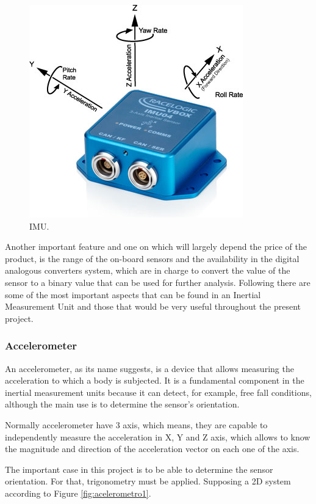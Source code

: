\begin{figure}[H]
	\center
	\includegraphics[scale=0.25]{imagenes/Balancing_robot/IMU3}
	\caption{IMU.}
	\label{fig:IMU3}
\end{figure}

Another important feature and one on which will largely depend the price of the product, is the range of the on-board sensors and the availability in the digital analogous converters system, which are in charge to convert the value of the sensor to a binary value that can be used for further analysis. \newline
Following there are some of the most important aspects that can be found in an Inertial Measurement Unit and those that would be very useful throughout the present project.

\subsubsection{Accelerometer}
An accelerometer, as its name suggests, is a device that allows measuring the acceleration to which a body is subjected. It is a fundamental component in the inertial measurement units because it can detect, for example, free fall conditions, although the main use is to determine the sensor’s orientation.\newline

Normally accelerometer have 3 axis, which means, they are capable to independently measure the acceleration in X, Y and Z axis, which allows to know the magnitude and direction of the acceleration vector on each one of the axis. \newline

The important case in this project is to be able to determine the sensor orientation. For that, trigonometry must be applied. Supposing a 2D system according to Figure \ref{fig:acelerometro1}.

